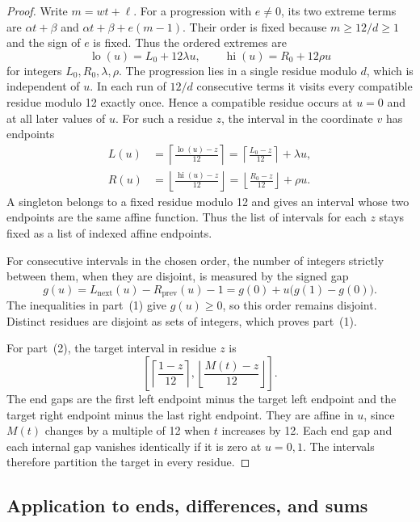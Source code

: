 \documentclass[11pt]{amsart}
\begin{document}
\begin{proof}
Write \(m=wt+\ell\). For a progression with \(e\ne0\), its two
extreme terms are \(\alpha t+\beta\) and
\(\alpha t+\beta+e(m-1)\). Their order is fixed because
\(m\ge12/d\ge1\) and the sign of \(e\) is fixed. Thus the
ordered extremes are
\[
  \operatorname{lo}(u)=L_0+12\lambda u,\qquad
  \operatorname{hi}(u)=R_0+12\rho u
\]
for integers \(L_0,R_0,\lambda,\rho\).
The progression lies in a single residue modulo \(d\),
which is independent of \(u\). In each run of \(12/d\)
consecutive terms it visits every compatible residue modulo 12
exactly once. Hence a compatible residue occurs at \(u=0\)
and at all later values of \(u\). For such a residue \(z\),
the interval in the coordinate \(v\) has endpoints
\begin{align*}
  L(u)&=\left\lceil\frac{\operatorname{lo}(u)-z}{12}\right\rceil
       =\left\lceil\frac{L_0-z}{12}\right\rceil+\lambda u,\\
  R(u)&=\left\lfloor\frac{\operatorname{hi}(u)-z}{12}\right\rfloor
       =\left\lfloor\frac{R_0-z}{12}\right\rfloor+\rho u.
\end{align*}
A singleton belongs to a fixed residue modulo 12 and gives an
interval whose two endpoints are the same affine function.
Thus the list of intervals for each \(z\) stays fixed as a list
of indexed affine endpoints.

For consecutive intervals in the chosen order, the number of
integers strictly between them, when they are disjoint, is
measured by the signed gap
\[
  g(u)=L_{\mathrm{next}}(u)-R_{\mathrm{prev}}(u)-1
      =g(0)+u\bigl(g(1)-g(0)\bigr).
\]
The inequalities in part~(1) give \(g(u)\ge0\), so this order
remains disjoint. Distinct residues are disjoint as sets of
integers, which proves part~(1).

For part~(2), the target interval in residue \(z\) is
\[
  \left[\left\lceil\frac{1-z}{12}\right\rceil,
         \left\lfloor\frac{M(t)-z}{12}\right\rfloor\right].
\]
The end gaps are the first left endpoint minus the target left
endpoint and the target right endpoint minus the last right
endpoint. They are affine in \(u\), since \(M(t)\) changes by a
multiple of 12 when \(t\) increases by 12. Each end gap and each
internal gap vanishes identically if it is zero at \(u=0,1\).
The intervals therefore partition the target in every residue.
\end{proof}

\subsection{Application to ends, differences, and sums}
\end{document}
